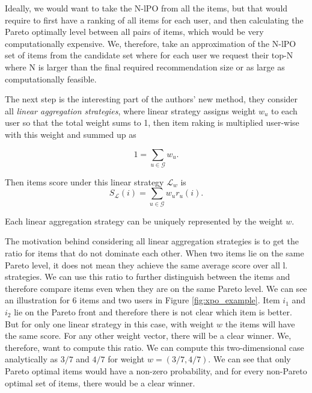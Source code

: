 Ideally, we would want to take the N-lPO from all the items, but that would require to first have a ranking of all items for each user, and then calculating the Pareto optimally level between all pairs of items, which would be very computationally expensive. We, therefore, take an approximation of the N-lPO set of items from the candidate set where for each user we request their top-N where N is larger than the final required recommendation size or as large as computationally feasible.

The next step is the interesting part of the authors' new method, they consider all \textit{linear aggregation strategies}, where linear strategy assigns weight $w_u$ to each user so that the total weight sums to 1, then item raking is multiplied user-wise with this weight and summed up as

\begin{equation}
    1 = \sum_{u \in \mathcal{G}} w_u.
\end{equation}

Then items score under this linear strategy $\mathcal{L}_w$ is
\begin{equation}
    S_\mathcal{L}(i) = \sum_{u \in \mathcal{G}} w_u r_u(i).
\end{equation}

Each linear aggregation strategy can be uniquely represented by the weight $w$.

The motivation behind considering all linear aggregation strategies is to get the ratio for items that do not dominate each other. When two items lie on the same Pareto level, it does not mean they achieve the same average score over all l. strategies. We can use this ratio to further distinguish between the items and therefore compare items even when they are on the same Pareto level. We can see an illustration for 6 items and two users in Figure \ref{fig:xpo_example}. Item $i_1$ and $i_2$ lie on the Pareto front and therefore there is not clear which item is better. But for only one linear strategy in this case, with weight $w$ the items will have the same score. For any other weight vector, there will be a clear winner. We, therefore, want to compute this ratio. We can compute this two-dimensional case analytically as $3/7$ and $4/7$ for weight $w = (3/7, 4/7)$. We can see that only Pareto optimal items would have a non-zero probability, and for every non-Pareto optimal set of items, there would be a clear winner.

